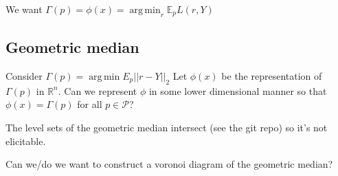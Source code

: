 \documentclass[12pt]{article}
\newcommand{\reals}{\mathbb{R}}
\newcommand{\E}{\mathbb{E}}
\renewcommand{\P}{\mathcal{P}}
\renewcommand{\P}{\mathcal{P}}
\DeclareMathOperator*{\argmin}{arg\,min}
\begin{document}
We want $\Gamma(p) = \phi(x) = \argmin_r \E_p L(r, Y)$

\subsection{Geometric median}
Consider $\Gamma(p) = \argmin E_p ||r - Y ||_2$
Let $\phi(x)$ be the representation of $\Gamma(p)$ in $\reals^n$.
Can we represent $\phi$ in some lower dimensional manner so that $\phi(x) = \Gamma(p)$ for all $p \in \P$?

The level sets of the geometric median intersect (see the git repo) so it's not elicitable.

Can we/do we want to construct a voronoi diagram of the geometric median?
\end{document}
